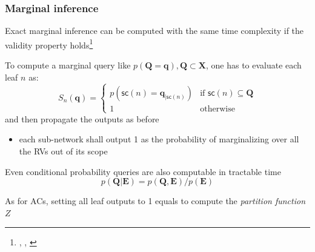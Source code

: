 \documentclass[10pt, t, xcolor={usenames,dvipsnames,svgnames}, compress]{beamer}
\newcommand{\customcite}[1]{\footnote{\scriptsize \citeauthor{#1}, \citetitle{#1}, \citeyear{#1}}}
\begin{document}
\begin{frame}
{\begin{minipage}[t]{0.49\textwidth}
  \end{minipage}
}
\end{frame}


\begin{frame}
  \frametitle{Marginal inference}

Exact marginal inference can be computed with the same time complexity if the
validity property holds\customcite{Poon2011}

To compute a marginal query like $p(\mathbf{Q=q}),
\mathbf{Q}\subset\mathbf{X}$, one has to evaluate each leaf $n$ as:
\begin{equation}
  \label{eq:marg}
  S_{n}(\mathbf{q}) = \begin{cases}
    p(\mathsf{sc}(n) =\mathbf{q}_{|\mathsf{sc}(n)}) & \text{if $\mathsf{sc}(n)\subseteq\mathbf{Q}$} \\
    1 & \text{otherwise}
  \end{cases}
\end{equation}
and then propagate the outputs as before

\begin{itemize}
\item each sub-network shall output 1 as the probability of marginalizing
over all the RVs out of its scope
\end{itemize}

Even conditional probability queries are also computable
in tractable time
$$p(\mathbf{Q}|\mathbf{E}) = p(\mathbf{Q}, \mathbf{E})/p(\mathbf{E})$$

As for ACs, setting all leaf outputs to 1 equals to compute the \emph{partition function}
$Z$ 
\end{frame}
\end{document}
